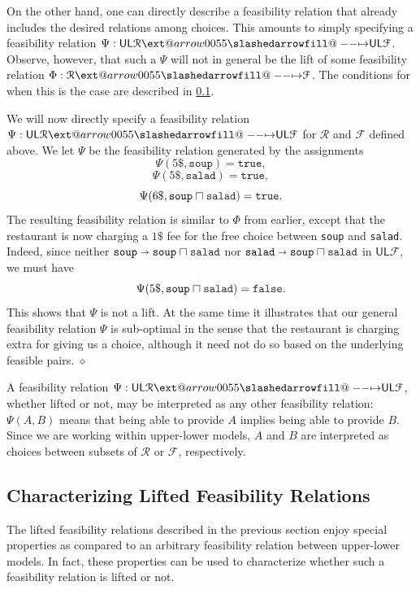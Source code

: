 \documentclass[12pt]{article}
\makeatletter
\theoremstyle{definition}
\theoremstyle{plain}
\theoremstyle{plain}
\theoremstyle{plain}
\theoremstyle{plain}
\theoremstyle{remark}
\newcommand{\continuation}{??}
\newenvironment{continueexample}[1]
{\renewcommand{\continuation}{\ref{#1}}\excont[continued]}
{\endexcont}
\newcommand\xqed[1]{%
	\leavevmode\unskip\penalty9999 \hbox{}\nobreak\hfill
	\quad\hbox{#1}}
\newcommand\exampleend{\xqed{$\diamond$}}
\theoremstyle{remark}
\newcommand{\mc}[1]{\mathcal{#1}}
\newcommand{\low}{\mathsf{L}}
\newcommand{\upper}{\mathsf{U}}
\newcommand{\true}{\mathtt{true}}
\newcommand{\false}{\mathtt{false}}
\def\slashedarrowfill@#1#2#3#4#5{%
	$\m@th\thickmuskip0mu\medmuskip\thickmuskip\thinmuskip\thickmuskip
	\relax#5#1\mkern-7mu%
	\cleaders\hbox{$#5\mkern-2mu#2\mkern-2mu$}\hfill
	\mathclap{#3}\mathclap{#2}%
	\cleaders\hbox{$#5\mkern-2mu#2\mkern-2mu$}\hfill
	\mkern-7mu#4$%
}
\def\rightslashedarrowfill@{%
	\slashedarrowfill@\relbar\relbar\mapstochar\rightarrow}
\newcommand\xslashedrightarrow[2][]{%
	\ext@arrow 0055{\rightslashedarrowfill@}{#1}{#2}}
\newcommand{\csqcap}{\color{OliveGreen}\bm{\sqcap}\color{Black}}
\makeatother
\begin{document}
On the other hand, one can directly describe a feasibility relation that already includes the desired relations among choices. This amounts to simply specifying a feasibility relation $\Psi: \upper\low\mc{R} \xslashedrightarrow{} \upper\low\mc{F}$. Observe, however, that such a $\Psi$ will not in general be the lift of some feasibility relation $\Phi: \mc{R} \xslashedrightarrow{} \mc{F}$. The conditions for when this is the case are described in \ref{sec:characterizing feas}.

\begin{continueexample}{ex:double order}
	We will now directly specify a feasibility relation $\Psi: \upper\low\mc{R} \xslashedrightarrow{} \upper\low\mc{F}$ for $\mc{R}$ and $\mc{F}$ defined above. We let $\Psi$ be the feasibility relation generated by the assignments
	$$ \Psi(5\$, \mathtt{soup}) = \true,$$
	$$ \Psi(5\$, \mathtt{salad}) = \true,$$
	$$ \Psi(6\$, \mathtt{soup} \csqcap \mathtt{salad}) = \true.$$
	The resulting feasibility relation is similar to $\Phi$ from earlier, except that the restaurant is now charging a $1\$$ fee for the free choice between \texttt{soup} and \texttt{salad}. Indeed, since neither $\mathtt{soup} \shortrightarrow \mathtt{soup} \csqcap \mathtt{salad}$ nor $\mathtt{salad} \shortrightarrow \mathtt{soup} \csqcap \mathtt{salad}$ in $\upper\low\mc{F}$, we must have
	$$ \Psi(5\$, \mathtt{soup} \csqcap \mathtt{salad}) = \false.$$
	This shows that $\Psi$ is not a lift. At the same time it illustrates that our general feasibility relation $\Psi$ is sub-optimal in the sense that the restaurant is charging extra for giving us a choice, although it need not do so based on the underlying feasible pairs. \exampleend
\end{continueexample}

\begin{tcolorbox}[title=Feasibility between Upper-lower Models, colframe=Apricot, colback = paleorange, coltitle = Sepia]
	A feasibility relation $\Psi: \upper\low\mc{R} \xslashedrightarrow{} \upper\low\mc{F}$, whether lifted or not, may be interpreted as any other feasibility relation: $\Psi(A,B)$ means that being able to provide $A$ implies being able to provide $B$. Since we are working within upper-lower models, $A$ and $B$ are interpreted as choices between subsets of $\mc{R}$ or $\mc{F}$, respectively.
\end{tcolorbox}

\subsection{Characterizing Lifted Feasibility Relations}\label{sec:characterizing feas}
The lifted feasibility relations described in the previous section enjoy special properties as compared to an arbitrary feasibility relation between upper-lower models. In fact, these properties can be used to characterize whether such a feasibility relation is lifted or not. 
\end{document}
